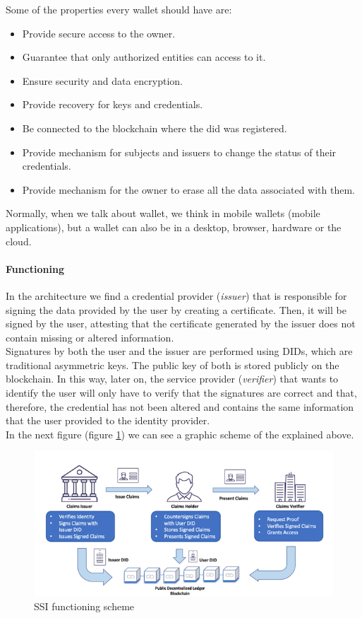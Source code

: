 Some of the properties every wallet should have are:
\begin{itemize}
    \item Provide secure access to the owner.
    \item Guarantee that only authorized entities can access to it.
    \item Ensure security and data encryption.
    \item Provide recovery for keys and credentials.
    \item Be connected to the blockchain where the \acrshort{did} was registered.
    \item Provide mechanism for subjects and issuers to change the status of their credentials.
    \item Provide mechanism for the owner to erase all the data associated with them.
\end{itemize}
Normally, when we talk about wallet, we think in mobile wallets (mobile applications), but a wallet can also be in a desktop, browser, hardware or the cloud.

\paragraph{Functioning}
In the architecture\cite{how-to-ssi} we find a credential provider (\textit{issuer}) that is responsible for signing the data provided by the user by creating a certificate. Then, it will be signed by the user, attesting that the certificate generated by the issuer does not contain missing or altered information.\\

Signatures by both the user and the issuer are performed using DIDs, which are traditional asymmetric keys. The public key of both is stored publicly on the blockchain. In this way, later on, the service provider (\textit{verifier}) that wants to identify the user will only have to verify that the signatures are correct and that, therefore, the credential has not been altered and contains the same information that the user provided to the identity provider.\\

In the next figure (figure \ref{fig:ssi-scheme}) we can see a graphic scheme of the explained above.
\begin{figure}[h]
    \centering
    \includegraphics[width=1.0\textwidth]{images/State of the Art/ssi/how-to-ssi.png}
    \caption{SSI functioning scheme}
    \label{fig:ssi-scheme}
\end{figure}

